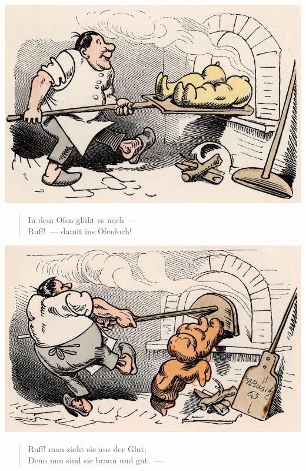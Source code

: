 \documentclass[a4paper,12pt]{article}
\begin{document}
\begin{center}\includegraphics[scale=.7, alt={... in das Ofenloch}]{images/6-12.jpg}\end{center}



\begin{verse}
In dem Ofen glüht es noch~—\\{}
Ruff!~— damit ins Ofenloch!
\end{verse}



\begin{center}\includegraphics[scale=.7, alt={... und aus der Glut}]{images/6-13.jpg}\end{center}



\begin{verse}
Ruff! man zieht sie aus der Glut;\\{}
Denn nun sind sie braun und gut.~—
\end{verse}
\end{document}
